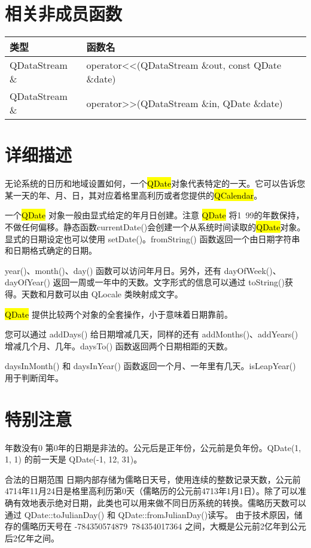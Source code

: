 \splitLine

\section{相关非成员函数}

\begin{tabular}{|l|l|}
\hline
类型&	函数名\\
\hline
QDataStream \& &	operator<<(QDataStream \&out, const QDate \&date) \\
\hline
QDataStream \&	& operator>>(QDataStream \&in, QDate \&date)\\
\hline
\end{tabular}

\section{详细描述}

无论系统的日历和地域设置如何，一个\hl{QDate}对象代表特定的一天。它可以告诉您某一天的年、月、日，其对应着格里高利历或者您提供的\hl{QCalendar}。

一个\hl{QDate} 对象一般由显式给定的年月日创建。注意 \hl{QDate} 将1~99的年数保持，不做任何偏移。静态函数currentDate()会创建一个从系统时间读取的\hl{QDate}对象。显式的日期设定也可以使用 setDate()。fromString() 函数返回一个由日期字符串和日期格式确定的日期。

year()、month()、day() 函数可以访问年月日。另外，还有 dayOfWeek()、dayOfYear() 返回一周或一年中的天数。文字形式的信息可以通过 toString()获得。天数和月数可以由 QLocale 类映射成文字。

\hl{QDate} 提供比较两个对象的全套操作，小于意味着日期靠前。

您可以通过 addDays() 给日期增减几天，同样的还有 addMonths()、addYears() 增减几个月、几年。daysTo() 函数返回两个日期相距的天数。

daysInMonth() 和 daysInYear() 函数返回一个月、一年里有几天。isLeapYear() 用于判断闰年。

\section{特别注意}

\begin{compactitem}
\item 年数没有0 第0年的日期是非法的。公元后是正年份，公元前是负年份。QDate(1, 1, 1) 的前一天是 QDate(-1, 12, 31)。
\item 合法的日期范围 日期内部存储为儒略日天号，使用连续的整数记录天数，公元前4714年11月24日是格里高利历第0天（儒略历的公元前4713年1月1日）。除了可以准确有效地表示绝对日期，此类也可以用来做不同日历系统的转换。儒略历天数可以通过 QDate::toJulianDay() 和 QDate::fromJulianDay()读写。 由于技术原因，储存的儒略历天号在 -784350574879~784354017364 之间，大概是公元前2亿年到公元后2亿年之间。
\end{compactitem}


